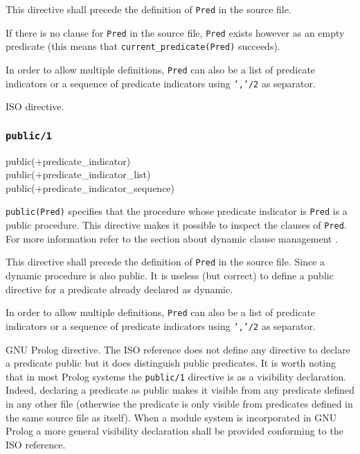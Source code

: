 This directive shall precede the definition of \texttt{Pred} in the source
file.

If there is no clause for \texttt{Pred} in the source file, \texttt{Pred}
exists however as an empty predicate (this means that
\texttt{current\_predicate(Pred)} succeeds). 

In order to allow multiple definitions, \texttt{Pred} can also be a list of
predicate indicators or a sequence of predicate indicators using
\texttt{','/2} as separator.

\Portability

ISO directive.

\subsubsection{\texttt{public/1}}
\label{public/1}

\begin{TemplatesOneCol}
public(+predicate\_indicator)\\
public(+predicate\_indicator\_list)\\
public(+predicate\_indicator\_sequence)

\end{TemplatesOneCol}

\Description

\texttt{public(Pred)} specifies that the procedure whose predicate indicator
is \texttt{Pred} is a public procedure. This directive makes it possible to
inspect the clauses of \texttt{Pred}. For more information refer to the
section about dynamic clause management .

This directive shall precede the definition of \texttt{Pred} in the source
file. Since a dynamic procedure is also public. It is useless (but correct)
to define a public directive for a predicate already declared as dynamic.

In order to allow multiple definitions, \texttt{Pred} can also be a list of
predicate indicators or a sequence of predicate indicators using
\texttt{','/2} as separator.

\Portability

GNU Prolog directive. The ISO reference does not define any directive to
declare a predicate public but it does distinguish public predicates. It is
worth noting that in most Prolog systems the \texttt{public/1} directive is
as a visibility declaration. Indeed, declaring a predicate as public makes
it visible from any predicate defined in any other file (otherwise the
predicate is only visible from predicates defined in the same source file as
itself). When a module system is incorporated in GNU Prolog a more general
visibility declaration shall be provided conforming to the ISO reference.

